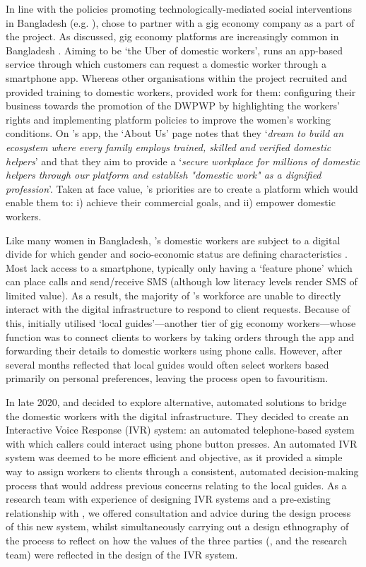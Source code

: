 In line with the policies promoting technologically-mediated social interventions in Bangladesh (e.g. \cite{hasnayen2016, Faroqi2019}), \NGO{} chose to partner with a gig economy company \PC{} as a part of the \SRP{} project. As discussed, gig economy platforms are increasingly common in Bangladesh \cite{Ahmed2020}. Aiming to be `the Uber of domestic workers', \PC{} runs an app-based service through which customers can request a domestic worker through a smartphone app. Whereas other organisations within the \SRP{} project recruited and provided training to domestic workers, \PC{} provided work for them: configuring their business towards the promotion of the DWPWP by highlighting the workers' rights and implementing platform policies to improve the women's working conditions. On \PC{}'s app, the `About Us' page notes that they `\textit{dream to build an ecosystem where every family employs trained, skilled and verified domestic helpers}' and that they aim to provide a `\textit{secure workplace for millions of domestic helpers through our platform and establish "domestic work" as a dignified profession}'. Taken at face value, \PC{}'s priorities are to create a platform which would enable them to: i) achieve their commercial goals, and ii) empower domestic workers.

Like many women in Bangladesh, \PC{}'s domestic workers are subject to a digital divide for which gender and socio-economic status are defining characteristics \cite{Genilo2015}. Most lack access to a smartphone, typically only having a `feature phone' which can place calls and send/receive SMS (although low literacy levels render SMS of limited value). As a result, the majority of \PC{}'s workforce are unable to directly interact with the digital infrastructure to respond to client requests. Because of this, \PC{} initially utilised `local guides'---another tier of gig economy workers---whose function was to connect clients to workers by taking orders through the \PC{} app and forwarding their details to domestic workers using phone calls. However, after several months \PC{} reflected that local guides would often select workers based primarily on personal preferences, leaving the process open to favouritism. 

In late 2020, \PC{} and \NGO{} decided to explore alternative, automated solutions to bridge the domestic workers with the digital infrastructure. They decided to create an Interactive Voice Response (IVR) system: an automated telephone-based system with which callers could interact using phone button presses. An automated IVR system was deemed to be more efficient and objective, as it provided a simple way to assign workers to clients through a consistent, automated decision-making process that would address previous concerns relating to the local guides. As a research team with experience of designing IVR systems and a pre-existing relationship with \NGO{}, we offered consultation and advice during the design process of this new system, whilst simultaneously carrying out a design ethnography of the process to reflect on how the values of the three parties (\NGO{}, \PC{} and the research team) were reflected in the design of the IVR system. 